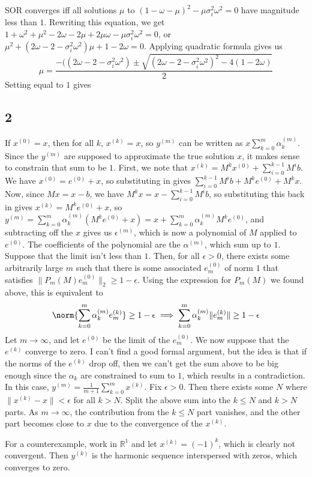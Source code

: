 \documentclass{article}
\newcommand{\ep}{\epsilon}
\newcommand{\rn}{\mathbb{R}}
\begin{document}
SOR converges iff all solutions $\mu$ to $(1-\omega-\mu)^2-\mu\sigma_i^2\omega^2=0$ have magnitude less than $1$. Rewriting this equation, we get $1+\omega^2+\mu^2-2\omega-2\mu+2\mu\omega-\mu\sigma_i^2\omega^2=0$, or $\mu^2+(2\omega-2-\sigma_i^2\omega^2)\mu+1-2\omega=0$. Applying quadratic formula gives us 
\[\mu=\frac{-((2\omega-2-\sigma_i^2\omega^2)\pm\sqrt{(2\omega-2-\sigma_i^2\omega^2)^2-4(1-2\omega)}}{2}\]
Setting equal to $1$ gives
\subsection*{2}
If $x^{(0)}=x$, then for all $k$, $x^{(k)}=x$, so $y^{(m)}$ can be written as $x\sum_{k=0}^m\alpha_k^{(m)}$. Since the $y^{(m)}$ are supposed to approximate the true solution $x$, it makes sense to constrain that sum to be $1$.
First, we note that $x^{(k)}=M^kx^{(0)}+\sum_{i=0}^{k-1}M^{i}b$. We have $x^{(0)}=e^{(0)}+x$, so substituting in gives $\sum_{i=0}^{k-1}M^{i}b+M^ke^{(0)}+M^kx$. Now, since $Mx=x-b$, we have $M^kx=x-\sum_{i=0}^{k-1}M^ib$, so substituting this back in gives $x^{(k)}=M^ke^{(0)}+x$, so $y^{(m)}=\sum_{k=0}^m\alpha_k^{(m)}(M^ke^{(0)}+x)=x+\sum_{k=0}^m\alpha_k^{(m)}M^ke^{(0)}$, and subtracting off the $x$ gives us $\ep^{(m)}$, which is now a polynomial of $M$ applied to $e^{(0)}$. The coefficients of the polynomial are the $\alpha^{(m)}$, which sum up to $1$.
Suppose that the limit isn't less than $1$. Then, for all $\ep>0$, there exists some arbitrarily large $m$ such that there is some associated $e_m^{(0)}$ of norm $1$ that satisfies $\|P_m(M)e_m^{(0)}\|_2\geq1-\ep$. Using the expression for $P_m(M)$ we found above, this is equivalent to 
\[\norm{\sum_{k=0}^m\alpha_k^{(m)}e_m^{(k)}}\geq1-\ep\implies\sum_{k=0}^m\alpha_k^{(m)}\|e_m^{(k)}\|\geq1-\ep\]
Let $m\to\infty$, and let $e^(0)$ be the limit of the $e_m^{(0)}$. We now suppose that the $e^{(k)}$ converge to zero. I can't find a good formal argument, but the idea is that if the norms of the $e^{(k)}$ drop off, then we can't get the sum above to be big enough since the $\alpha_k$ are constrained to sum to $1$, which results in a contradiction.
In this case, $y^{(m)}=\frac{1}{m+1}\sum_{k=0}^mx^{(k)}$. Fix $\ep>0$. Then there exists some $N$ where $\|x^{(k)}-x\|<\ep$ for all $k>N$. Split the above sum into the $k\leq N$ and $k>N$ parts. As $m\to\infty$, the contribution from the $k\leq N$ part vanishes, and the other part becomes close to $x$ due to the convergence of the $x^{(k)}$.

For a counterexample, work in $\rn^1$ and let $x^{(k)}=(-1)^k$, which is clearly not convergent. Then $y^{(k)}$ is the harmonic sequence interspersed with zeros, which converges to zero. 
\end{document}
